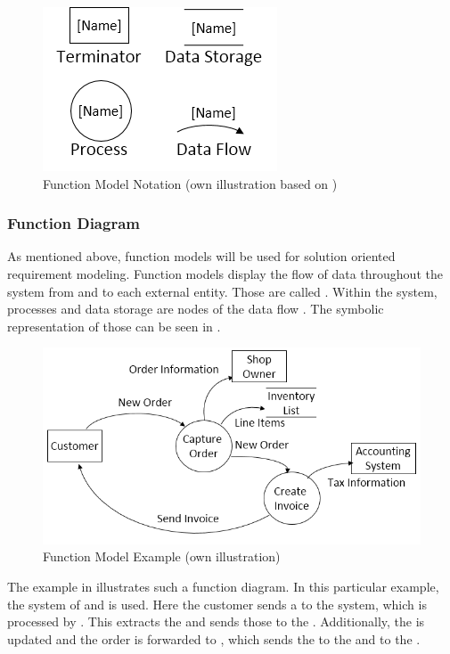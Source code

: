 \begin{figure}[H]
    \centering
    \includegraphics[scale=0.9]{img/fmSymb.png}
    \caption[Function Model Notation]{Function Model Notation (own illustration based on \cite[190]{Pohl.2007})}
    \label{fig:fmSymb}
\end{figure}


\subsubsection{Function Diagram}

As mentioned above, function models will be used for solution oriented requirement modeling. Function models display the flow of data throughout the system from and to each external entity. Those are called  \parencite[190]{Pohl.2007}. Within the system, processes and data storage are nodes of the data flow \parencite[cf.][190-191]{Pohl.2007}. The symbolic representation of those can be seen in .  

\begin{figure}[H]
    \centering
    \includegraphics[width=\textwidth]{img/fmEx.png}
    \caption[Function Model Example]{Function Model Example (own illustration)}
    \label{fig:fmEx}
\end{figure}

The example in  illustrates such a function diagram. In this particular example, the system of  and  is used. Here the customer sends a  to the system, which is processed by . This extracts the  and sends those to the . Additionally, the  is updated and the order is forwarded to , which sends the  to the  and  to the .

